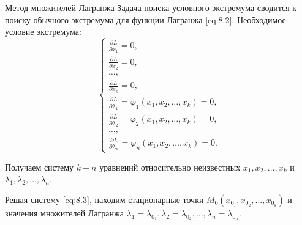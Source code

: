 \begin{tbox}{Метод множителей Лагранжа}
	Задача поиска условного экстремума сводится к поиску обычного экстремума для функции Лагранжа \eqref{eq:8.2}. Необходимое условие экстремума:
	\begin{equation} \label{eq:8.3}
		\begin{cases}
			\frac{\partial L}{\partial x_1} = 0, \\
			\frac{\partial L}{\partial x_2} = 0, \\
			\dots, \\
			\frac{\partial L}{\partial x_k} = 0, \\
			\frac{\partial L}{\partial \lambda_1} = \varphi_1(x_1, x_2, \dots, x_k) = 0, \\
			\frac{\partial L}{\partial \lambda_2} = \varphi_2(x_1, x_2, \dots, x_k) = 0, \\
			\dots, \\
			\frac{\partial L}{\partial \lambda_n} = \varphi_n(x_1, x_2, \dots, x_k) = 0.
		\end{cases}
	\end{equation}

	Получаем систему $k + n$ уравнений относительно неизвестных $x_1, x_2, \dots, x_k$ и $\lambda_1, \lambda_2, \dots, \lambda_n$.

	Решая систему \eqref{eq:8.3}, находим стационарные точки $M_0(x_{0_1}, x_{0_2}, \dots, x_{0_k})$ и значения множителей Лагранжа $\lambda_1 = \lambda_{0_1}, \lambda_2 = \lambda_{0_2}, \dots, \lambda_n = \lambda_{0_n}$.
\end{tbox}

